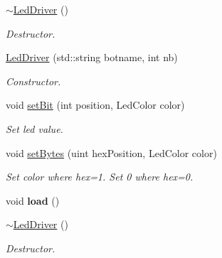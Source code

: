\begin{DoxyCompactItemize}
\mbox{\label{classLedDriver_a8b6afd79e2715068ff08c51a9df28065}} 
\hyperlink{classLedDriver_a8b6afd79e2715068ff08c51a9df28065}{$\sim$\+Led\+Driver} ()
\begin{DoxyCompactList}\small\item\em Destructor. \end{DoxyCompactList}\item 
\mbox{\label{classLedDriver_a1c7f2bc148f3a1572f255d6c21e8b131}} 
\hyperlink{classLedDriver_a1c7f2bc148f3a1572f255d6c21e8b131}{Led\+Driver} (std\+::string botname, int nb)
\begin{DoxyCompactList}\small\item\em Constructor. \end{DoxyCompactList}\item 
void \hyperlink{classLedDriver_a1856fb030d88bcacdc37dfce7f0f8136}{set\+Bit} (int position, Led\+Color color)
\begin{DoxyCompactList}\small\item\em Set led value. \end{DoxyCompactList}\item 
void \hyperlink{classLedDriver_a765b8b642e13715ccaff1cbcff01dc97}{set\+Bytes} (uint hex\+Position, Led\+Color color)
\begin{DoxyCompactList}\small\item\em Set color where hex=1. Set 0 where hex=0. \end{DoxyCompactList}\item 
\mbox{\label{classLedDriver_a79e0896965b659cb7bb6442d4c89b2a1}} 
void {\bfseries load} ()
\item 
\mbox{\label{classLedDriver_a8b6afd79e2715068ff08c51a9df28065}} 
\hyperlink{classLedDriver_a8b6afd79e2715068ff08c51a9df28065}{$\sim$\+Led\+Driver} ()
\begin{DoxyCompactList}\small\item\em Destructor. \end{DoxyCompactList}\end{DoxyCompactItemize}
